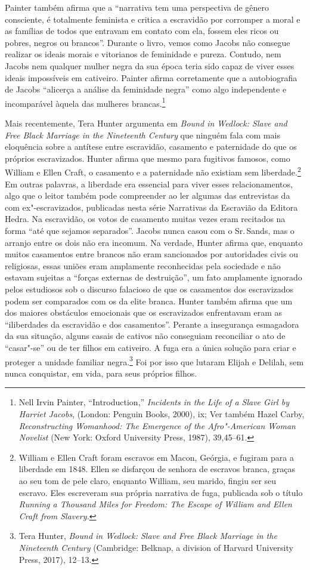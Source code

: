 Painter também afirma que a ``narrativa tem uma perspectiva de gênero
consciente, é totalmente feminista e critica a escravidão por corromper
a moral e as famílias de todos que entravam em contato com ela, fossem
eles ricos ou pobres, negros ou brancos''. Durante o livro, vemos como
Jacobs não consegue realizar os ideais morais e vitorianos de feminidade
e pureza. Contudo, nem Jacobs nem qualquer mulher negra da sua época
teria sido capaz de viver esses ideais impossíveis em cativeiro. Painter
afirma corretamente que a autobiografia de Jacobs ``alicerça a análise
da feminidade negra'' como algo independente e incomparável àquela das
mulheres brancas.\footnote{Nell Irvin Painter, ``Introduction,''
  \emph{Incidents in the Life of a Slave Girl by Harriet Jacobs},
  (London: Penguin Books, 2000), ix; Ver também Hazel Carby,
  \emph{Reconstructing Womanhood: The Emergence of the Afro"-American
  Woman Novelist} (New York: Oxford University Press, 1987), 39,45--61.}

Mais recentemente, Tera Hunter argumenta em \emph{Bound in Wedlock:
Slave and Free Black Marriage in the Nineteenth Century} que ninguém
fala com mais eloquência sobre a antítese entre escravidão, casamento e
paternidade do que os próprios escravizados. Hunter afirma que mesmo
para fugitivos famosos, como William e Ellen Craft, o casamento
e a paternidade não existiam sem liberdade.\footnote{William e Ellen Craft foram escravos em Macon, Geórgia, e fugiram
  para a liberdade em 1848. Ellen se disfarçou de senhora de escravos
  branca, graças ao seu tom de pele claro, enquanto William, seu marido,
  fingiu ser seu escravo. Eles escreveram sua própria narrativa de fuga,
  publicada sob o título \emph{Running a Thousand Miles for Freedom: The
  Escape of William and Ellen Craft from Slavery.}} Em outras palavras,
a liberdade era essencial para viver esses relacionamentos, algo que o
leitor também pode compreender ao ler algumas das entrevistas da  com
ex"-escravizados, publicadas nesta série Narrativas da Escravião da Editora
Hedra. Na escravidão, os votos de casamento muitas vezes eram recitados
na forma ``até que sejamos separados''. Jacobs nunca casou com o Sr.\,Sands, mas o arranjo entre os dois não era incomum. Na verdade, Hunter
afirma que, enquanto muitos casamentos entre brancos não eram
sancionados por autoridades civis ou religiosas, essas uniões eram
amplamente reconhecidas pela sociedade e não estavam sujeitas a ``forças
externas de destruição'', um fato amplamente ignorado pelos estudiosos
sob o discurso falacioso de que os casamentos dos escravizados podem
ser comparados com os da elite branca. Hunter também
afirma que um dos maiores obstáculos emocionais que os
escravizados enfrentavam eram as ``iliberdades da escravidão e dos casamentos''.
Perante a insegurança esmagadora da sua situação, alguns casais
de cativos não conseguiam reconciliar o ato de ``casar"-se'' ou de ter
filhos em cativeiro. A fuga era a única solução para criar e proteger a
unidade familiar negra.\footnote{Tera Hunter, \emph{Bound in Wedlock:
  Slave and Free Black Marriage in the Nineteenth Century} (Cambridge:
  Belknap, a division of Harvard University Press, 2017), 12--13.}%
  Foi por isso que lutaram Elijah e Delilah, sem nunca
conquistar, em vida, para seus próprios filhos.

